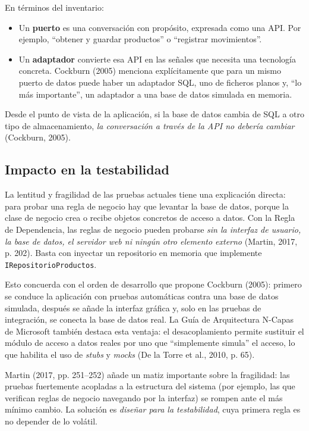 \documentclass[11pt,a4paper]{article}
\begin{document}
En términos del inventario:
\begin{itemize}[leftmargin=1.5em]
  \item Un \textbf{puerto} es una conversación con propósito, expresada como una API. Por ejemplo, ``obtener y guardar productos'' o ``registrar movimientos''.
  \item Un \textbf{adaptador} convierte esa API en las señales que necesita una tecnología concreta. Cockburn (2005) menciona explícitamente que para un mismo puerto de datos puede haber un adaptador SQL, uno de ficheros planos y, ``lo más importante'', un adaptador a una base de datos simulada en memoria.
\end{itemize}

Desde el punto de vista de la aplicación, si la base de datos cambia de SQL a otro tipo de almacenamiento, \emph{la conversación a través de la API no debería cambiar} (Cockburn, 2005).

\subsection{Impacto en la testabilidad}

La lentitud y fragilidad de las pruebas actuales tiene una explicación directa: para probar una regla de negocio hay que levantar la base de datos, porque la clase de negocio crea o recibe objetos concretos de acceso a datos. Con la Regla de Dependencia, las reglas de negocio pueden probarse \emph{sin la interfaz de usuario, la base de datos, el servidor web ni ningún otro elemento externo} (Martin, 2017, p. 202). Basta con inyectar un repositorio en memoria que implemente \texttt{IRepositorioProductos}.

Esto concuerda con el orden de desarrollo que propone Cockburn (2005): primero se conduce la aplicación con pruebas automáticas contra una base de datos simulada, después se añade la interfaz gráfica y, solo en las pruebas de integración, se conecta la base de datos real. La Guía de Arquitectura N-Capas de Microsoft también destaca esta ventaja: el desacoplamiento permite sustituir el módulo de acceso a datos reales por uno que ``simplemente simula'' el acceso, lo que habilita el uso de \emph{stubs} y \emph{mocks} (De la Torre et al., 2010, p. 65).

Martin (2017, pp. 251--252) añade un matiz importante sobre la fragilidad: las pruebas fuertemente acopladas a la estructura del sistema (por ejemplo, las que verifican reglas de negocio navegando por la interfaz) se rompen ante el más mínimo cambio. La solución es \emph{diseñar para la testabilidad}, cuya primera regla es no depender de lo volátil.
\end{document}
